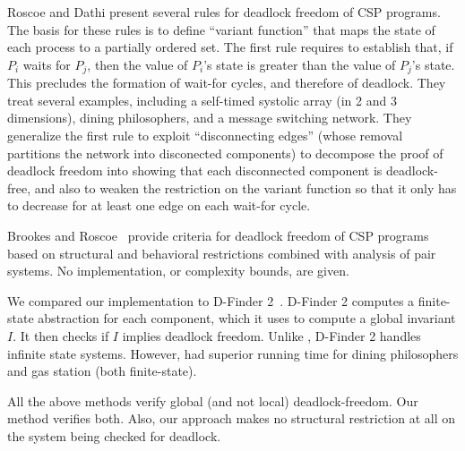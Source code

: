 Roscoe and Dathi \cite{RD87} present several rules for deadlock freedom of CSP programs. The basis for these rules is to define ``variant function'' that maps
the state of each process to a partially ordered set. The first rule requires to establish that, if $P_i$ waits for $P_j$, then the value of $P_i$'s state is greater than the value of
$P_j$'s state. This precludes the formation of wait-for cycles, and therefore of deadlock. They treat several examples, including a self-timed
systolic array (in 2 and 3 dimensions), dining philosophers, and a message switching network.
They generalize the first rule to exploit ``disconnecting edges'' (whose removal partitions the network into disconected components) to decompose the proof of deadlock freedom
into showing that each disconnected component is deadlock-free, and also to weaken the restriction on the variant function so that it only has to
decrease for at least one edge on each wait-for cycle.



Brookes and Roscoe~\cite{brookes91deadlockFreedom} provide criteria for
deadlock freedom of CSP programs based on structural and behavioral restrictions
combined with analysis of pair systems.
No implementation, or complexity bounds, are given.



We compared our implementation \ldfctool to D-Finder 2~\cite{DFinder2}. D-Finder 2
computes a finite-state abstraction for each component, which it uses
to compute a global invariant $I$. It then checks if $I$ 
implies deadlock freedom.  Unlike \ldfctool, D-Finder 2 
handles infinite state systems.
However, \ldfctool had superior running time for
dining philosophers and gas station (both finite-state).


All the above methods verify global (and not local) deadlock-freedom.
Our method verifies both.
Also, our approach makes no structural restriction at all on the system being
checked for deadlock.


